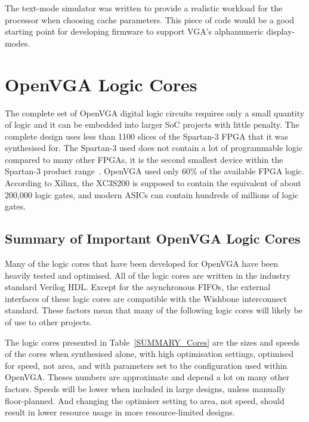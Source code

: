 The text-mode simulator was written to provide a realistic workload for the
processor when choosing cache parameters. This piece of code would be a good
starting point for developing firmware to support VGA's alphanumeric
display-modes.


\section{OpenVGA Logic Cores}
The complete set of OpenVGA digital logic circuits requires only a small quantity
of logic and it can be embedded into larger SoC projects with little penalty. The
complete design uses less than 1100 slices of the Spartan-3 FPGA that it was
synthesised for. The Spartan-3 used does not contain a lot of programmable logic
compared to many other FPGAs, it is the second smallest device within the
Spartan-3 product range~\cite{Xilinx_SP3_DS}. OpenVGA used only 60\% of the
available FPGA logic. According to Xilinx, the XC3S200 is supposed to contain the
equivalent of about 200,000 logic gates, and modern ASICs can contain hundreds of
millions of logic gates.


\subsection{Summary of Important OpenVGA Logic Cores}
Many of the logic cores that have been developed for OpenVGA have been heavily
tested and optimised. All of the logic cores are written in the industry standard
Verilog HDL. Except for the asynchronous FIFOs, the external interfaces of these
logic cores are compatible with the Wishbone interconnect standard. These factors
mean that many of the following logic cores will likely be of use to other
projects.

The logic cores presented in Table~\ref{SUMMARY_Cores} are the sizes and speeds
of the cores when synthesised alone, with high optimisation settings, optimised
for speed, not area, and with parameters set to the configuration used within
OpenVGA. Theses numbers are approximate and depend a lot on many other factors.
Speeds will be lower when included in large designs, unless manually
floor-planned. And changing the optimiser setting to area, not speed, should
result in lower resource usage in more resource-limited designs.

